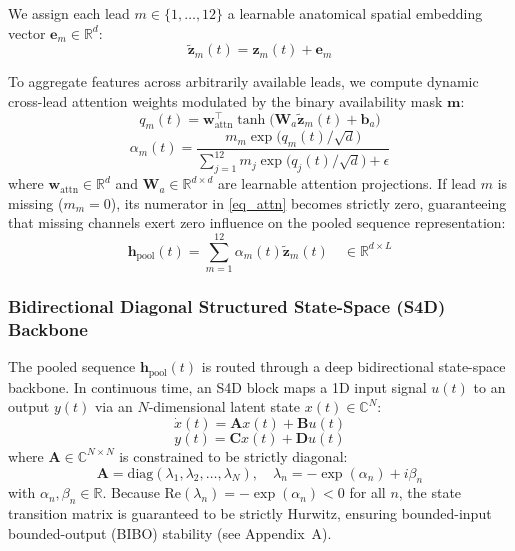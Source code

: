 \documentclass[journal,11pt,draftclsnofoot,onecolumn]{IEEEtran}
\begin{document}
We assign each lead $m \in \{1, \dots, 12\}$ a learnable anatomical spatial embedding vector $\mathbf{e}_m \in \mathbb{R}^d$:
\begin{equation}
    \tilde{\mathbf{z}}_m(t) = \mathbf{z}_m(t) + \mathbf{e}_m
\end{equation}

To aggregate features across arbitrarily available leads, we compute dynamic cross-lead attention weights modulated by the binary availability mask $\mathbf{m}$:
\begin{equation}
    q_m(t) = \mathbf{w}_{\text{attn}}^\top \tanh\big(\mathbf{W}_a \tilde{\mathbf{z}}_m(t) + \mathbf{b}_a\big)
\end{equation}
\begin{equation}
    \alpha_m(t) = \frac{m_m \exp\big(q_m(t) / \sqrt{d}\big)}{\sum_{j=1}^{12} m_j \exp\big(q_j(t) / \sqrt{d}\big) + \epsilon}
    \label{eq_attn}
\end{equation}
where $\mathbf{w}_{\text{attn}} \in \mathbb{R}^d$ and $\mathbf{W}_a \in \mathbb{R}^{d \times d}$ are learnable attention projections. If lead $m$ is missing ($m_m = 0$), its numerator in \eqref{eq_attn} becomes strictly zero, guaranteeing that missing channels exert zero influence on the pooled sequence representation:
\begin{equation}
    \mathbf{h}_{\text{pool}}(t) = \sum_{m=1}^{12} \alpha_m(t) \tilde{\mathbf{z}}_m(t) \quad \in \mathbb{R}^{d \times L}
\end{equation}

\subsubsection{Bidirectional Diagonal Structured State-Space (S4D) Backbone}
The pooled sequence $\mathbf{h}_{\text{pool}}(t)$ is routed through a deep bidirectional state-space backbone. In continuous time, an S4D block maps a 1D input signal $u(t)$ to an output $y(t)$ via an $N$-dimensional latent state $x(t) \in \mathbb{C}^N$:
\begin{equation}
    \dot{x}(t) = \mathbf{A} x(t) + \mathbf{B} u(t)
\end{equation}
\begin{equation}
    y(t) = \mathbf{C} x(t) + \mathbf{D} u(t)
\end{equation}
where $\mathbf{A} \in \mathbb{C}^{N \times N}$ is constrained to be strictly diagonal:
\begin{equation}
    \mathbf{A} = \text{diag}(\lambda_1, \lambda_2, \dots, \lambda_N), \quad \lambda_n = -\exp(\alpha_n) + i \beta_n
\end{equation}
with $\alpha_n, \beta_n \in \mathbb{R}$. Because $\text{Re}(\lambda_n) = -\exp(\alpha_n) < 0$ for all $n$, the state transition matrix is guaranteed to be strictly Hurwitz, ensuring bounded-input bounded-output (BIBO) stability (see Appendix~A).
\end{document}
